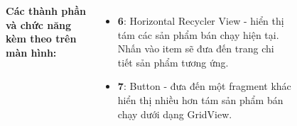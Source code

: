\documentclass{beamer}
\begin{document}
\begin{frame}
\begin{columns}
\begin{figure}
        \end{figure}
        \indent \textbf{Các thành phần và chức năng kèm theo trên màn hình:}
        \begin{itemize}
            \item \textbf{6}: Horizontal Recycler View - hiển thị tám các sản phẩm bán chạy hiện tại. Nhấn vào item sẽ đưa đến trang chi tiết sản phẩm tương ứng.
            \item \textbf{7}: Button - đưa đến một fragment khác hiển thị nhiều hơn tám sản phẩm bán chạy dưới dạng GridView.
        \end{itemize}
    \end{columns}
\end{frame}

\end{document}
